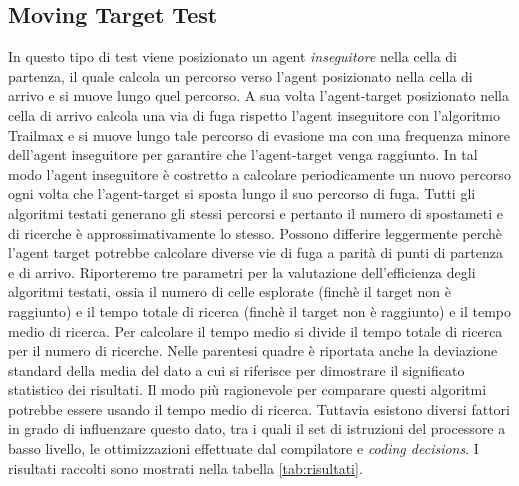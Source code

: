 \documentclass[11pt]{book}
\begin{document}
{\begin{table}[H]
{}

\end{table}

\fi
\subsection{Moving Target Test}
\par{In questo tipo di test viene posizionato un agent \emph{inseguitore} nella cella di partenza, il quale calcola un percorso verso l'agent posizionato nella cella di arrivo e si muove lungo quel percorso. A sua volta l'agent-target posizionato nella cella di arrivo calcola una via di fuga rispetto l'agent inseguitore con l'algoritmo Trailmax e si muove lungo tale percorso di evasione ma con una frequenza minore dell'agent inseguitore per garantire che l'agent-target venga raggiunto. In tal modo l'agent inseguitore \`e costretto a calcolare periodicamente un nuovo percorso ogni volta che l'agent-target si sposta lungo il suo percorso di fuga. Tutti gli algoritmi testati generano gli stessi percorsi e pertanto il numero di spostameti e di ricerche \`e approssimativamente lo stesso. Possono differire leggermente perch\`e l'agent target potrebbe calcolare diverse vie di fuga a parit\`a di punti di partenza e di arrivo. Riporteremo tre parametri per la valutazione dell'efficienza degli algoritmi testati, ossia il numero di celle esplorate (finch\`e il target non \`e raggiunto) e il tempo totale di ricerca (finch\`e il target non \`e raggiunto) e il tempo medio di ricerca. Per calcolare il tempo medio si divide il tempo totale di ricerca per il numero di ricerche. Nelle parentesi quadre \`e riportata anche la deviazione standard della media del dato a cui si riferisce per dimostrare il significato statistico dei risultati. Il modo pi\`u ragionevole per comparare questi algoritmi potrebbe essere usando il tempo medio di ricerca. Tuttavia esistono diversi fattori in grado di influenzare questo dato, tra i quali il set di istruzioni del processore a basso livello, le ottimizzazioni effettuate dal compilatore e \emph{coding decisions}. I risultati raccolti sono mostrati nella tabella \ref{tab:risultati}.}

\begin{table}[H]
\caption {Risultati Moving Target Test } \label{tab:risultati} 
\centering

\end{table}}
\end{document}
